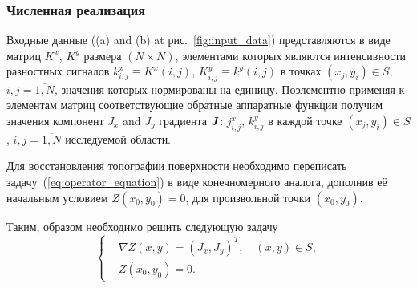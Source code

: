 \documentclass{beamer}
\begin{document}
\begin{frame}[c,allowframebreaks]
    \frametitle{Численная реализация}

    Входные данные ((a) and (b) at рис.~\ref{fig:input_data}) представляются в виде матриц
    $K^x$, $K^y$ размера $(N \times N)$, элементами которых являются интенсивности разностных
    сигналов $k^x_{i,j} \equiv K^x (i,j)$, $K^y_{i,j} \equiv k^y (i,j)$
    в точках $(x_j, y_i) \in S$, $i,j = \overline{1,N}$, значения которых нормированы на единицу.
    Поэлементно применяя к элементам матриц соответствующие обратные аппаратные функции получим
    значения компонент $J_x$ and $J_y$ градиента ${\textbf{\emph{J}}}$: $j^x_{i,j}$,
    $k^y_{i,j}$ в каждой точке $(x_j, y_i) \in S$, $i,j = \overline{1,N}$ исследуемой области.

    Для восстановления топографии поверхности необходимо переписать
    задачу~(\ref{eq:operator_equation}) в виде конечномерного аналога, дополнив её начальным
    условием $Z(x_0,y_0) = 0$, для произвольной точки $(x_0, y_0)$.

    \framebreak

    Таким, образом необходимо решить следующую задачу
    \begin{equation}
        \label{system_of_equations}
        \left\{
            \begin{aligned}
                &\nabla Z(x,y) = (J_x, J_y)^T, \quad (x,y)\in S, \\
                &Z(x_0,y_0) = 0.
            \end{aligned}
        \right.
    \end{equation}

    \framebreak


\end{frame}
\end{document}
